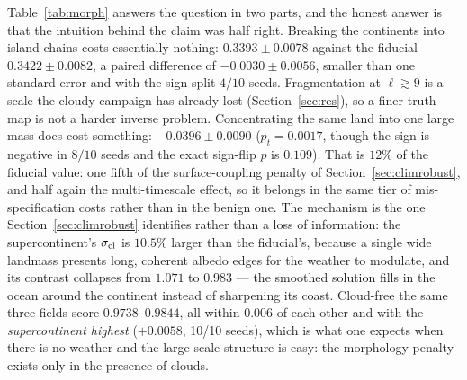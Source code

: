 \documentclass[twocolumn,10pt]{article}
\begin{document}
\begin{table}[t]
\centering
\caption{Surface-morphology sensitivity, 10 seeds each, paired against the
earthlike reconstruction on the same seeds. The cloud-free columns separate a
resolution effect from a weather effect: all three morphologies are recovered to
$r\ge0.974$ without clouds, so the cloudy spread is a weather--surface coupling,
not an information loss.}
\label{tab:morph}
\footnotesize
\setlength{\tabcolsep}{3pt}
\renewcommand{\arraystretch}{1.05}
\end{table}

Table~\ref{tab:morph} answers the question in two parts, and the honest
answer is that the intuition behind the claim was half right. Breaking the continents into island
chains costs essentially nothing: $0.3393\pm0.0078$ against the fiducial
$0.3422\pm0.0082$, a paired difference of $-0.0030\pm0.0056$, smaller than one
standard error and with the sign split $4/10$ seeds. Fragmentation at
$\ell\gtrsim9$ is a scale the cloudy campaign has already lost
(Section~\ref{sec:res}), so a finer truth map is not a harder inverse problem.
Concentrating the same land into one large mass does cost something:
$-0.0396\pm0.0090$ ($p_t=0.0017$, though the sign is negative in $8/10$ seeds and
the exact sign-flip $p$ is $0.109$). That is $12\%$ of the fiducial value: one
fifth of the surface-coupling penalty of Section~\ref{sec:climrobust}, and half
again the multi-timescale effect, so it belongs in the same tier of
mis-specification costs rather than in the benign one.
The mechanism is the one Section~\ref{sec:climrobust} identifies rather than a
loss of information: the supercontinent's $\sigma_{\rm cl}$ is $10.5\%$ larger
than the fiducial's, because a single wide landmass presents long, coherent
albedo edges for the weather to modulate, and its contrast collapses from
$1.071$ to $0.983$ --- the smoothed solution fills in the ocean around the
continent instead of sharpening its coast. Cloud-free the same three fields
score $0.9738$--$0.9844$, all within $0.006$ of each other and with the
\emph{supercontinent highest} ($+0.0058$, 10/10 seeds), which is what one
expects when there is no weather and the large-scale structure is easy: the
morphology penalty exists only in the presence of clouds.
\end{document}
